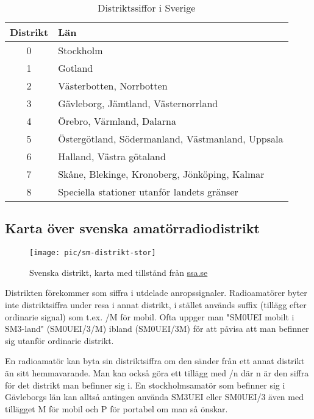 \begin{table}[h]
	\centering
\begin{tabular}{cl}
	\textbf{Distrikt} & \textbf{Län}                                     \\ \hline %
	      0           & Stockholm                                        \\
	      1           & Gotland                                          \\
	      2           & Västerbotten, Norrbotten                         \\
	      3           & Gävleborg, Jämtland, Västernorrland              \\
	      4           & Örebro, Värmland, Dalarna                        \\
	      5           & Östergötland, Södermanland, Västmanland, Uppsala \\
	      6           & Halland, Västra götaland                         \\
	      7           & Skåne, Blekinge, Kronoberg, Jönköping, Kalmar    \\
	      8           & Speciella stationer utanför landets gränser
\end{tabular}
\caption{Distriktssiffor i Sverige}
\end{table}

\subsection{Karta över svenska amatörradiodistrikt}

\begin{figure}
	\centering
	\texttt{[image: pic/sm-distrikt-stor]}
	\label{fig:sm-distrikt}
	\caption{Svenska distrikt, karta med tillstånd från
          \href{https://SSA.SE}{ssa.se}}
\end{figure}

Distrikten förekommer som siffra i utdelade anropssignaler. Radioamatörer byter
inte distriktsiffra under resa i annat distrikt, i stället används suffix
(tillägg efter ordinarie signal) som t.ex. /M för mobil. Ofta uppger man "SM0UEI
mobilt i SM3-land" (SM0UEI/3/M) ibland (SM0UEI/3M) för att påvisa att man
befinner sig utanför ordinarie distrikt.

En radioamatör kan byta sin distriktsiffra om den sänder från ett annat distrikt
än sitt hemmavarande. Man kan också göra ett tillägg med /n där n är den siffra
för det distrikt man befinner sig i. En stockholmsamatör som befinner sig i
Gävleborgs län kan alltså antingen använda SM3UEI eller SM0UEI/3 även med
tillägget M för mobil och P för portabel om man så önskar.


